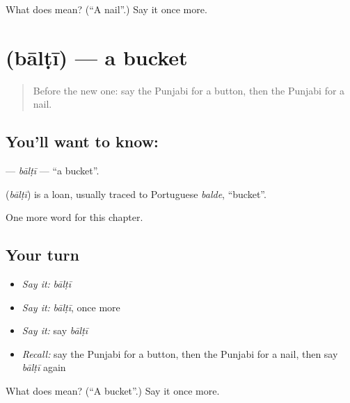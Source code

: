 \begin{tcolorbox}[breakable,colback=teal!4,colframe=teal!35!black,title={Before you move on}]
What does  mean? (\textquotedblleft{}A nail\textquotedblright{}.) Say it once more.
\end{tcolorbox}
\section[\texorpdfstring{\pa{ਬਾਲਟੀ} (bālṭī)}{ਬਾਲਟੀ (bālṭī)}]{ (bālṭī) — a bucket}

\label{lesson:PA-C116-balti}



\begin{quote}
Before the new one: say the Punjabi for a button, then the Punjabi for a nail.
\end{quote}

\subsection*{You'll want to know: }
\textbf{} — \emph{bālṭī} — \textquotedblleft{}a bucket\textquotedblright{}.

\begin{cousinweb}
\textbf{} (\emph{bālṭī}) is a loan, usually traced to Portuguese \emph{balde}, \textquotedblleft{}bucket\textquotedblright{}.
\end{cousinweb}

\begin{grammarlens}[title={What you've built}]
One more word for this chapter.
\end{grammarlens}

\subsection*{Your turn}
\begin{itemize}
\raggedright
  \item \emph{Say it:} \emph{bālṭī}
  \item \emph{Say it:} \emph{bālṭī}, once more
  \item \emph{Say it:} say \emph{bālṭī}
  \item \emph{Recall:} say the Punjabi for a button, then the Punjabi for a nail, then say \emph{bālṭī} again
\end{itemize}

\begin{tcolorbox}[breakable,colback=teal!4,colframe=teal!35!black,title={Before you move on}]
What does  mean? (\textquotedblleft{}A bucket\textquotedblright{}.) Say it once more.
\end{tcolorbox}
